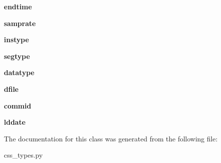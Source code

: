 \begin{DoxyCompactItemize}
\item 
\hypertarget{classcss__types_1_1wfdisc28_ad044eb37983e9bab7e76f8052ee19bdd}{}{\bfseries endtime}\label{classcss__types_1_1wfdisc28_ad044eb37983e9bab7e76f8052ee19bdd}

\item 
\hypertarget{classcss__types_1_1wfdisc28_a0eee00ad0b269ab6d22cb3e394c49f8a}{}{\bfseries samprate}\label{classcss__types_1_1wfdisc28_a0eee00ad0b269ab6d22cb3e394c49f8a}

\item 
\hypertarget{classcss__types_1_1wfdisc28_a029f1d66564b96d84689ffdb330b56b9}{}{\bfseries instype}\label{classcss__types_1_1wfdisc28_a029f1d66564b96d84689ffdb330b56b9}

\item 
\hypertarget{classcss__types_1_1wfdisc28_ae2b6856c17983f0fd46187638eb3687e}{}{\bfseries segtype}\label{classcss__types_1_1wfdisc28_ae2b6856c17983f0fd46187638eb3687e}

\item 
\hypertarget{classcss__types_1_1wfdisc28_a6f805f84efb8a600a7c16f3690c6bbfd}{}{\bfseries datatype}\label{classcss__types_1_1wfdisc28_a6f805f84efb8a600a7c16f3690c6bbfd}

\item 
\hypertarget{classcss__types_1_1wfdisc28_a21d81918be78a79e93e07e9d78451b71}{}{\bfseries dfile}\label{classcss__types_1_1wfdisc28_a21d81918be78a79e93e07e9d78451b71}

\item 
\hypertarget{classcss__types_1_1wfdisc28_afa52454d9193fae0bf1be5f5d7745a3a}{}{\bfseries commid}\label{classcss__types_1_1wfdisc28_afa52454d9193fae0bf1be5f5d7745a3a}

\item 
\hypertarget{classcss__types_1_1wfdisc28_ac11c60c28985995d38793c40cb829fe7}{}{\bfseries lddate}\label{classcss__types_1_1wfdisc28_ac11c60c28985995d38793c40cb829fe7}

\end{DoxyCompactItemize}


The documentation for this class was generated from the following file\+:\begin{DoxyCompactItemize}
\item 
css\+\_\+types.\+py\end{DoxyCompactItemize}
